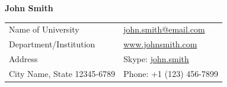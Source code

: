 \documentclass[letterpaper,11pt,oneside]{article}
\newcommand*{\Skype}{\href{skype:john.smith?add}{john.smith}}
\newcommand{\Absender}[1][\normalsize]{\Skype}
\begin{document}

\noindent  \LARGE{\textbf{John Smith}}  \\
\vspace{-2ex}
\hline
\normalsize


\begin{center}
\begin{tabular}{l l}
 Name of University    & \hspace{1in} \href{mailto:john.smith@email.com}{john.smith@email.com} \\
 Department/Institution    & \hspace{1in}  \href{www.johnsmith.com}{www.johnsmith.com}   \\
 Address             & \hspace{1in} Skype: \Absender  \\
 City Name, State 12345-6789 & \hspace{1in} Phone: +1 (123) 456-7899 \\
\end{tabular}
\end{center}

\vspace{1em}

\end{document}
